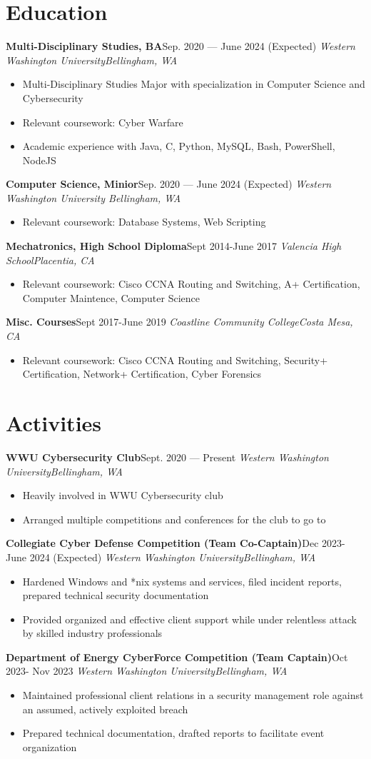 \documentclass{article}
\newcommand{\topLevelItem}[4]{
    \textbf{#1}\hfill #4\newline
    \emph{#2\hfill #3}\newline
    \vspace{-18pt}\begin{itemize}
}
\newcommand{\topLevelItemEnd}{\end{itemize}\vspace{5pt}}
\newcommand{\lowLevelItem}[1]{
    \item\small{#1}\vspace{-8pt}
}
\begin{document}
    \section*{Education}
        \topLevelItem{Multi-Disciplinary Studies, BA}{Western Washington University}{Bellingham, WA}{Sep. 2020 — June 2024 (Expected)}
            \lowLevelItem{Multi-Disciplinary Studies Major with specialization in Computer Science and Cybersecurity}
            \lowLevelItem{Relevant coursework: Cyber Warfare}
            \lowLevelItem{Academic experience with Java, C, Python, MySQL, Bash, PowerShell, NodeJS}
        \topLevelItemEnd
        \topLevelItem{Computer Science, Minior}{Western Washington University }{Bellingham, WA}{Sep. 2020 — June 2024 (Expected)}
            \lowLevelItem{Relevant coursework: Database Systems, Web Scripting}
        \topLevelItemEnd
        \topLevelItem{Mechatronics, High School Diploma}{Valencia High School}{Placentia, CA}{Sept 2014-June 2017}
            \lowLevelItem{Relevant coursework: Cisco CCNA Routing and Switching, A+ Certification, Computer Maintence, Computer Science}
        \topLevelItemEnd
        \topLevelItem{Misc. Courses}{Coastline Community College}{Costa Mesa, CA}{Sept 2017-June 2019}
            \lowLevelItem{Relevant coursework: Cisco CCNA Routing and Switching, Security+ Certification, Network+ Certification, Cyber Forensics}
        \topLevelItemEnd
        
    \section*{Activities}
        \topLevelItem{WWU Cybersecurity Club}{Western Washington University}{Bellingham, WA}{Sept. 2020 — Present}
            \lowLevelItem{Heavily involved in WWU Cybersecurity club}
            \lowLevelItem{Arranged multiple competitions and conferences for the club to go to}
        \topLevelItemEnd
        \topLevelItem{Collegiate Cyber Defense Competition (Team Co-Captain)}{Western Washington University}{Bellingham, WA}{Dec 2023-June 2024 (Expected)}
            \lowLevelItem{Hardened Windows and *nix systems and services, filed incident reports, prepared technical security documentation}
            \lowLevelItem{Provided organized and effective client support while under relentless attack by skilled industry professionals}
        \topLevelItemEnd
        \topLevelItem{Department of Energy CyberForce Competition (Team Captain)}{Western Washington University}{Bellingham, WA}{Oct 2023- Nov 2023}
            \lowLevelItem{Maintained professional client relations in a security management role against an assumed, actively exploited breach}
            \lowLevelItem{Prepared technical documentation, drafted reports to facilitate event organization}
        \topLevelItemEnd
        
\end{document}
